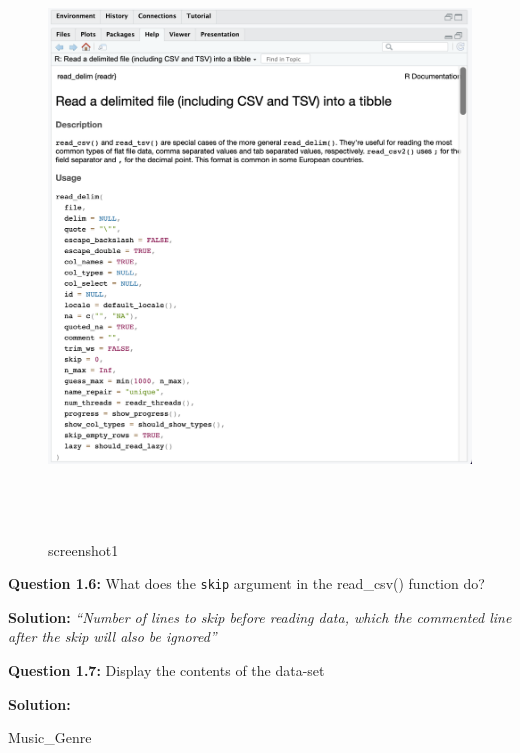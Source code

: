 \documentclass[
]{article}
\newenvironment{Shaded}{\begin{snugshade}}{\end{snugshade}}
\newcommand{\NormalTok}[1]{#1}
\begin{document}
\begin{figure}
\includegraphics[width=480px,height=600px]{screenshot1} \caption{screenshot1}\label{fig:unnamed-chunk-5}
\end{figure}

\textbf{Question 1.6:} What does the \texttt{skip} argument in the
read\_csv() function do?

\textbf{Solution:} \emph{``Number of lines to skip before reading data,
which the commented line after the skip will also be ignored''}

\textbf{Question 1.7:} Display the contents of the data-set

\textbf{Solution:}

\begin{Shaded}
\begin{Highlighting}[]
\NormalTok{Music\_Genre}
\end{Highlighting}
\end{Shaded}
\end{document}
